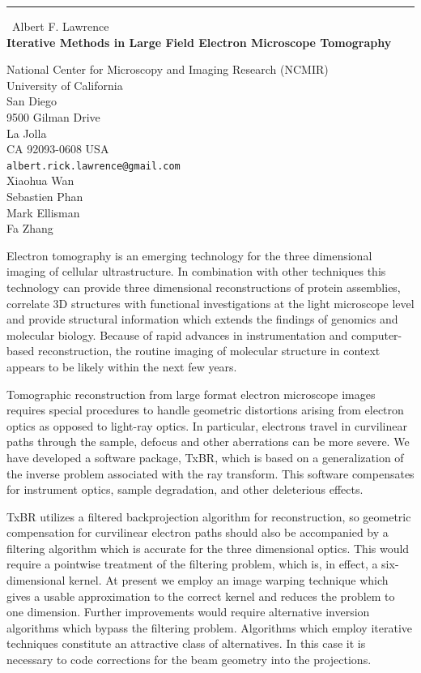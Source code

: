 \documentclass{report}
\begin{document}
\begin{center}
\rule{6in}{1pt} \
{\large Albert F. Lawrence \\
{\bf Iterative Methods in Large Field Electron Microscope Tomography }}

National Center for Microscopy and Imaging Research (NCMIR) \\ University of California \\ San Diego \\ 9500 Gilman Drive \\ La Jolla \\ CA 92093-0608 USA
\\
{\tt albert.rick.lawrence@gmail.com}\\
Xiaohua Wan\\
Sebastien Phan\\
Mark Ellisman\\
Fa Zhang\end{center}

Electron tomography is an emerging technology for the three dimensional
imaging of cellular ultrastructure. In combination with other techniques
this technology can provide three dimensional reconstructions of protein
assemblies, correlate 3D structures with functional investigations at the
light microscope level and provide structural information which extends
the findings of genomics and molecular biology. Because of rapid advances
in instrumentation and computer-based reconstruction, the routine imaging
of molecular structure in context appears to be likely within the next
few years.

Tomographic reconstruction from large format electron microscope images
requires special procedures to handle geometric distortions arising from
electron optics as opposed to light-ray optics. In particular, electrons
travel in curvilinear paths through the sample, defocus and other
aberrations can be more severe. We have developed a software package,
TxBR, which is based on a generalization of the inverse problem
associated with the ray transform. This software compensates for
instrument optics, sample degradation, and other deleterious effects.

TxBR utilizes a filtered backprojection algorithm for reconstruction, so
geometric compensation for curvilinear electron paths should also be
accompanied by a filtering algorithm which is accurate for the three
dimensional optics. This would require a pointwise treatment of the
filtering problem, which is, in effect, a six-dimensional kernel. At
present we employ an image warping technique which gives a usable
approximation to the correct kernel and reduces the problem to one
dimension. Further improvements would require alternative inversion
algorithms which bypass the filtering problem. Algorithms which employ
iterative techniques constitute an attractive class of alternatives. In
this case it is necessary to code corrections for the beam geometry into
the projections.
\end{document}
